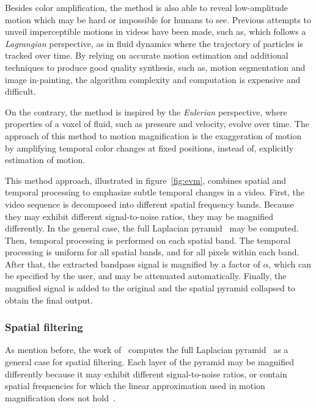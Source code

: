 Besides color amplification, the \evm{} method is also able to reveal
low-amplitude motion which may be hard or impossible for humans to see.
Previous attempts to unveil imperceptible motions in videos have been
made, such as, \cite{Liu2005Motion} which follows a \emph{Lagrangian}
perspective, as in fluid dynamics where the trajectory of particles
is tracked over time. By relying on accurate motion estimation and
additional techniques to produce good quality synthesis, such as,
motion segmentation and image in-painting, the algorithm complexity
and computation is expensive and difficult.

On the contrary, the \evm{} method is inspired by the \emph{Eulerian}
perspective, where properties of a voxel of fluid, such as pressure
and velocity, evolve over time. The approach of this method to motion
magnification is the exaggeration of motion by amplifying temporal
color changes at fixed positions, instead of, explicitly estimation
of motion.

This method approach, illustrated in figure~\ref{fig:evm}, combines
spatial and temporal processing to emphasize subtle temporal changes
in a video. First, the video sequence is decomposed into different
spatial frequency bands. Because they may exhibit different
signal-to-noise ratios, they may be magnified differently.
In the general case, the full Laplacian pyramid~\cite{Burt1983Laplacian}
may be computed. Then, temporal processing is performed on each
spatial band. The temporal processing is uniform for all spatial
bands, and for all pixels within each band. After that, the extracted
bandpass signal is magnified by a factor of $\alpha$, which can be
specified by the user, and may be attenuated automatically. Finally,
the magnified signal is added to the original and the spatial pyramid
collapsed to obtain the final output.

\subsubsection{Spatial filtering} \label{sec:sota:post:evm:spatial}

As mention before, the work of~\cite{Wu2012Eulerian} computes the full
Laplacian pyramid~\cite{Burt1983Laplacian} as a general case for spatial
filtering. Each layer of the pyramid may be magnified differently because
it may exhibit different signal-to-noise ratios, or contain spatial frequencies
for which the linear approximation used in motion magnification does not
hold~\cite[Section 3]{Wu2012Eulerian}.

